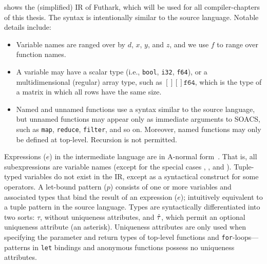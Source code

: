  shows the (simplified) IR of Futhark,
which will be used for all compiler-chapters of this thesis.  The
syntax is intentionally similar to the source language.  Notable
details include:
\begin{itemize}
\item Variable names are ranged over by $d$, $x$, $y$, and $z$, and we use
  $f$ to range over function names.
\item A variable may have a scalar type (i.e., \texttt{bool},
  \texttt{i32}, \texttt{f64}), or a multidimensional (regular) array
  type, such as $[][]\texttt{f64}$, which is the type of a matrix in
  which all rows have the same size.
\item Named and unnamed functions use a syntax similar to the source
  language, but unnamed functions may appear only as immediate
  arguments to SOACS, such as \lstinline{map}, \lstinline{reduce},
  \lstinline{filter}, and so on. Moreover, named functions may only be
  defined at top-level.  Recursion is not permitted.
\end{itemize}
Expressions ($e$) in the intermediate language are in A-normal
form~\cite{Sabry:1992:RPC:141478.141563}.  That is, all subexpressions
are variable names (except for the special cases , ,
and ).  Tuple-typed variables do not exist in the IR, except
as a syntactical construct for some operators.  A let-bound pattern
($p$) consists of one or more variables and associated types that bind
the result of an expression ($e$); intuitively equivalent to a tuple
pattern in the source language.  Types are syntactically
differentiated into two sorts: $\tau$, without uniqueness attributes,
and $\hat{\tau}$, which permit an optional uniqueness attribute (an
asterisk).  Uniqueness attributes are only used when specifying the
parameter and return types of top-level functions and
\lstinline{for}-loops---patterns in \lstinline{let} bindings and
anonymous functions possess no uniqueness attributes.


